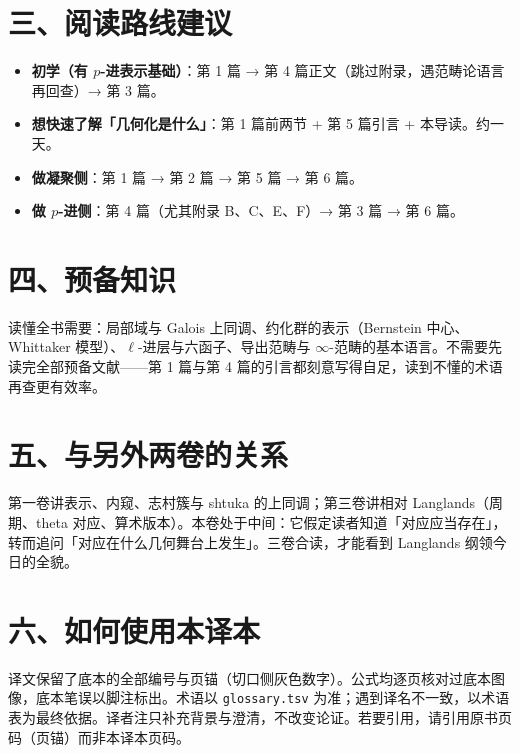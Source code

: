 \section*{三、阅读路线建议}

\begin{itemize}[leftmargin=2em,itemsep=0.25em]
\item \textbf{初学（有 $p$-进表示基础）}：第 1 篇 → 第 4 篇正文（跳过附录，遇范畴论语言再回查）→ 第 3 篇。
\item \textbf{想快速了解「几何化是什么」}：第 1 篇前两节 + 第 5 篇引言 + 本导读。约一天。
\item \textbf{做凝聚侧}：第 1 篇 → 第 2 篇 → 第 5 篇 → 第 6 篇。
\item \textbf{做 $p$-进侧}：第 4 篇（尤其附录 B、C、E、F）→ 第 3 篇 → 第 6 篇。
\end{itemize}

\section*{四、预备知识}

读懂全书需要：局部域与 Galois 上同调、约化群的表示（Bernstein 中心、Whittaker 模型）、$\ell$-进层与六函子、导出范畴与 $\infty$-范畴的基本语言。不需要先读完全部预备文献——第 1 篇与第 4 篇的引言都刻意写得自足，读到不懂的术语再查更有效率。

\section*{五、与另外两卷的关系}

第一卷讲表示、内窥、志村簇与 shtuka 的上同调；第三卷讲相对 Langlands（周期、theta 对应、算术版本）。本卷处于中间：它假定读者知道「对应应当存在」，转而追问「对应在什么几何舞台上发生」。三卷合读，才能看到 Langlands 纲领今日的全貌。

\section*{六、如何使用本译本}

译文保留了底本的全部编号与页锚（切口侧灰色数字）。公式均逐页核对过底本图像，底本笔误以脚注标出。术语以 \texttt{glossary.tsv} 为准；遇到译名不一致，以术语表为最终依据。译者注只补充背景与澄清，不改变论证。若要引用，请引用原书页码（页锚）而非本译本页码。
